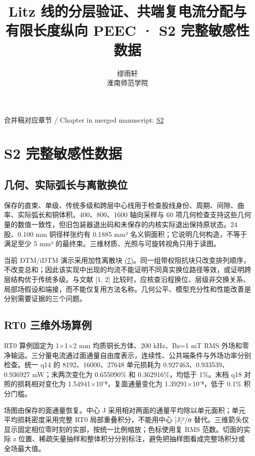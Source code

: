 \documentclass[11pt]{article}
\begin{document}
\title{Litz 线的分层验证、共端复电流分配与有限长度纵向 PEEC · S2 完整敏感性数据}
\author{缪雨轩\\淮南师范学院}
\date{}
\maketitle
\noindent 合并稿对应章节 / Chapter in merged manuscript: \href{paper_zh-CN_single.pdf#chapter-S2}{S2}\par
\FloatBarrier
\section*{S2 完整敏感性数据}
\hypertarget{chapter-S2}{}
\subsection*{几何、实际弧长与离散换位}
\hypertarget{S2.geometry.heading}{}
保存的直束、单级、传统多级和跨层中心线用于检查股线身份、周期、间隙、曲率、实际弧长和铜体积。400、800、1600 轴向采样与 60 项几何检查支持这些几何量的数值一致性，但旧包装器退出码和未保存的内核实际退出保持原状态。24 股、0.100 mm 铜径样张约有 0.1885 mm² 名义铜面积；它说明几何构造，不等于满足至少 5 mm² 的最终束。三维材质、光照与可旋转视角只用于读图。


当前 DTM/iDTM 演示采用加性离散块 \href{paper_zh-CN_single.pdf#E06}{(7)}。同一组带权阻抗块只改变排列顺序，不改变总和；因此该实现中出现的均流不能证明不同真实换位路径等效，或证明跨层结构优于传统多级。与文献 [1, 2] 比较时，应核查沿程换位、层级非交换关系、局部场假设和端接，而不能仅复用方法名称。几何公平、模型充分性和性能改善是分别需要证据的三个问题。


\subsection*{RT0 三维外场算例}
\hypertarget{S2.rt0.heading}{}
RT0 算例固定为 1×1×2 mm 均质铜长方体、200 kHz、Bz=1 mT RMS 外场和零净输运。三分量电流通过面通量自由度表示，连续性、公共端条件与外场功率分别检查。统一 q14 的 8192、16000、27648 单元损耗为 0.927463、0.933539、0.936927 mW；末两次变化为 0.655090\% 和 0.362916\%，均低于 1\%。末档 q18 对照的损耗相对变化为 1.54941×10⁻⁸，复面通量变化为 1.39291×10⁻⁸，低于 0.1\% 积分门槛。


场图由保存的面通量恢复。中心 J 采用相对两面的通量平均除以单元面积；单元平均损耗密度采用完整 RT0 局部重叠积分，不能用中心 |J|²/σ 替代。三维箭头仅显示固定相位零时刻的实部，按统一比例缩放；色标使用复 RMS 范数。切面的实际 z 位置、稀疏矢量抽样和整体积分分别标注，避免把抽样图看成完整场积分或全场最大值。
\end{document}
